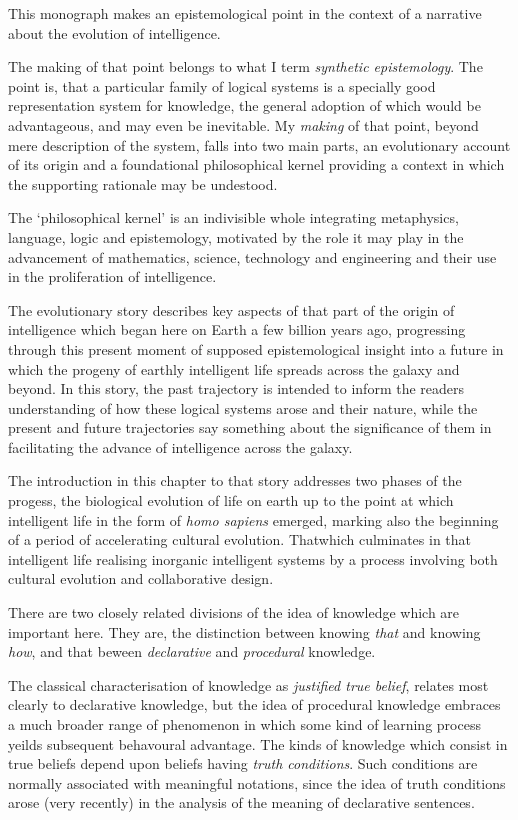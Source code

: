 
This monograph makes an epistemological point in the context of a narrative about the evolution of intelligence.

The making of that point belongs to what I term \emph{synthetic epistemology}.
The point is, that a particular family of logical systems is a specially good representation system for knowledge, the general adoption of which would be advantageous, and may even be inevitable.
My \emph{making} of that point, beyond mere description of the system, falls into two main parts, an evolutionary account of its origin and a foundational philosophical kernel providing a context in which the supporting rationale may be undestood.

The `philosophical kernel' is an indivisible whole integrating metaphysics, language, logic and epistemology, motivated by the role it may play in the advancement of mathematics, science, technology and engineering and their use in the proliferation of intelligence.

The evolutionary story describes key aspects of that part of the origin of intelligence which began here on Earth a few billion years ago, progressing through this present moment of supposed epistemological insight into a future in which the progeny of earthly intelligent life spreads across the galaxy and beyond.
In this story, the past trajectory is intended to inform the readers understanding of how these logical systems arose and their nature, while the present and future trajectories say something about the significance of them in facilitating the advance of intelligence across the galaxy.

The introduction in this chapter to that story addresses two phases of the progess, the biological evolution of life on earth up to the point at which intelligent life in the form of \emph{homo sapiens} emerged, marking also the beginning of a period of accelerating cultural evolution.
Thatwhich culminates in that intelligent life realising inorganic intelligent systems by a process involving both cultural evolution and collaborative design.

There are two closely related divisions of the idea of knowledge which are important here.
They are, the distinction between knowing \emph{that} and knowing \emph{how}, and that beween \emph{declarative} and \emph{procedural} knowledge.

The classical characterisation of knowledge as \emph{justified true belief}, relates most clearly to declarative knowledge, but the idea of procedural knowledge embraces a much broader range of phenomenon in which some kind of learning process yeilds subsequent behavoural advantage.
The kinds of knowledge which consist in true beliefs depend upon beliefs having \emph{truth conditions}.
Such conditions are normally associated with meaningful notations, since the idea of truth conditions arose (very recently) in the analysis of the meaning of declarative sentences.

